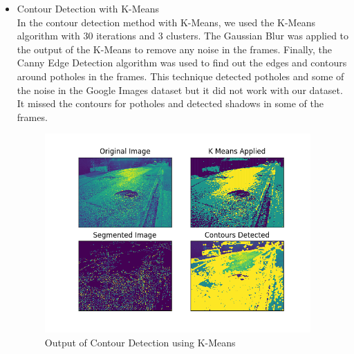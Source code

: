 \documentclass[12pt,a4paper]{article}
\begin{document}
\begin{itemize}
    \newpage
%
    
\item Contour Detection with K-Means \\

In the contour detection method with K-Means, we used the K-Means algorithm with 30 iterations and 3 clusters. The Gaussian Blur was applied to the output of the K-Means to remove any noise in the frames. Finally, the Canny Edge Detection algorithm was used to find out the edges and contours around potholes in the frames. This technique detected potholes and some of the noise in the Google Images dataset but it did not work with our dataset. It missed the contours for potholes and detected shadows in some of the frames.



    \begin{figure}[ht!]
        \centering
        \includegraphics[width = 4in]{images/kmeans_1.png}
        \caption{Output of Contour Detection using K-Means}
    \end{figure}


\end{itemize}
\end{document}
